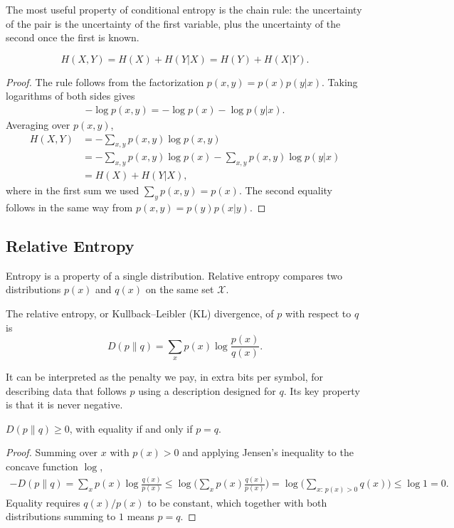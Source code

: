 The most useful property of conditional entropy is the chain rule: the uncertainty of the pair is the uncertainty of the first variable, plus the uncertainty of the second once the first is known.

\begin{theorem}\label{thm:chain}
\begin{equation*}
    H(X,Y) = H(X) + H(Y|X) = H(Y) + H(X|Y).
\end{equation*}
\end{theorem}

\begin{proof}
The rule follows from the factorization \(p(x,y) = p(x)p(y|x)\). Taking logarithms of both sides gives
\begin{align*}
-\log p(x,y) = -\log p(x) - \log p(y|x).
\end{align*}
Averaging over \(p(x,y)\),
\begin{align*}
    H(X,Y) &= - \sum_{x,y} p(x,y) \log p(x,y) \\
           &= - \sum_{x,y} p(x,y) \log p(x) - \sum_{x,y} p(x,y) \log p(y|x)  \\
           &= H(X) + H(Y|X),
\end{align*}
where in the first sum we used \(\sum_y p(x,y) = p(x)\). The second equality follows in the same way from \(p(x,y) = p(y)p(x|y)\).
\end{proof}

\subsection{Relative Entropy}
Entropy is a property of a single distribution. Relative entropy compares two distributions \(p(x)\) and \(q(x)\) on the same set \(\mathcal{X}\).

\begin{definition}
The relative entropy, or Kullback--Leibler (KL) divergence, of \(p\) with respect to \(q\) is
\begin{equation*}
D(p\|q) = \sum_{x} p(x) \log \frac{p(x)}{q(x)}.
\end{equation*}
\end{definition}

It can be interpreted as the penalty we pay, in extra bits per symbol, for describing data that follows \(p\) using a description designed for \(q\). Its key property is that it is never negative.

\begin{theorem}\label{thm:gibbs}
\(D(p\|q) \geq 0\), with equality if and only if \(p = q\).
\end{theorem}
\begin{proof}
Summing over \(x\) with \(p(x) > 0\) and applying Jensen's inequality to the concave function \(\log\),
\begin{align*}
-D(p\|q) = \sum_{x} p(x) \log \frac{q(x)}{p(x)} \leq \log \Big(\sum_{x} p(x) \frac{q(x)}{p(x)}\Big) = \log \Big(\sum_{x:\,p(x)>0} q(x)\Big) \leq \log 1 = 0.
\end{align*}
Equality requires \(q(x)/p(x)\) to be constant, which together with both distributions summing to \(1\) means \(p = q\).
\end{proof}

